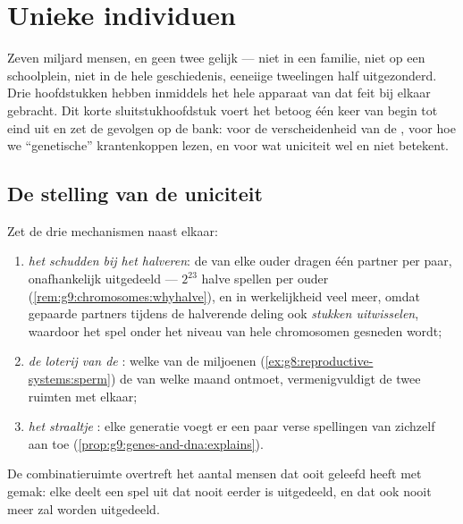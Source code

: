 \chapter{Unieke individuen}\label{ch:g9:unique-individuals}

Zeven miljard mensen, en geen twee gelijk --- niet in een
familie, niet op een schoolplein, niet in de hele geschiedenis,
eeneiige tweelingen half uitgezonderd. Drie hoofdstukken hebben
inmiddels het hele apparaat van dat feit bij elkaar gebracht.
Dit korte sluitstukhoofdstuk voert het betoog één keer van
begin tot eind uit en zet de gevolgen op de bank: voor de
verscheidenheid van de , voor hoe we ``genetische''
krantenkoppen lezen, en voor wat uniciteit wel en niet betekent.

\section{De stelling van de uniciteit}

\begin{proposition}\label{prop:g9:unique-individuals:theorem}
Zet de drie mechanismen naast elkaar:
\begin{enumerate}
  \item \emph{het schudden bij het halveren}: de
         van elke ouder dragen één partner per
        paar, onafhankelijk uitgedeeld --- $2^{23}$ halve
        spellen per ouder
        (\cref{rem:g9:chromosomes:whyhalve}), en in werkelijkheid
        veel meer, omdat gepaarde partners tijdens de halverende
        deling ook \emph{stukken uitwisselen}, waardoor het spel
        onder het niveau van hele chromosomen gesneden wordt;
  \item \emph{de loterij van de }: welke  van
        de miljoenen (\cref{ex:g8:reproductive-systems:sperm})
        de  van welke maand ontmoet, vermenigvuldigt de
        twee ruimten met elkaar;
  \item \emph{het straaltje }: elke generatie voegt er
        een paar verse spellingen van zichzelf aan toe
        (\cref{prop:g9:genes-and-dna:explains}).
\end{enumerate}
De combinatieruimte overtreft het aantal mensen dat ooit geleefd
heeft met gemak: elke  deelt een spel uit dat nooit
eerder is uitgedeeld, en dat ook nooit meer zal worden uitgedeeld.
\end{proposition}
\admitted

